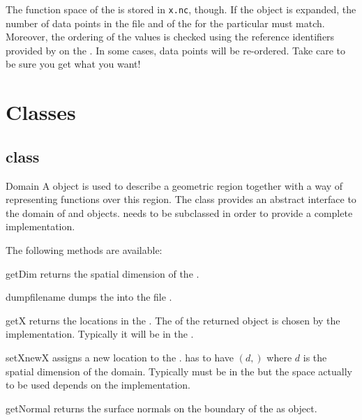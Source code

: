The function space of the \Data is stored in {\tt x.nc}, though.
If the \Data object
is expanded, the number of data points in the file and of the \Domain for the particular \FunctionSpace must match. 
Moreover, the ordering of the values is checked using the reference identifiers provided by 
\FunctionSpace on the \Domain. In some cases, data points will be re-ordered. Take care to be sure you get what you want!


\section{\escript Classes}

\subsection{\Domain class}
\begin{classdesc}{Domain}{}
A \Domain object is used to describe a geometric region together with 
a way of representing functions over this region.
The \Domain class provides an abstract interface to the domain of \FunctionSpace and \Data objects.
\Domain needs to be subclassed in order to provide a complete implementation.
\end{classdesc}
The following methods are available:
\begin{methoddesc}[Domain]{getDim}{}
returns the spatial dimension of the \Domain.
\end{methoddesc}
\begin{methoddesc}[Domain]{dump}{filename}
dumps the \Domain into the file .
\end{methoddesc}
\begin{methoddesc}[Domain]{getX}{}
returns the locations in the \Domain. The \FunctionSpace of the returned
\Data object is chosen by the \Domain implementation. Typically it will be
in the \Function.
\end{methoddesc}

\begin{methoddesc}[Domain]{setX}{newX}
assigns a new location to the \Domain.  has to have \Shape $(d,)$
where $d$ is the spatial dimension of the domain. Typically  must be
in the \ContinuousFunction but the space actually to be used depends on the \Domain implementation.
\end{methoddesc}

\begin{methoddesc}[Domain]{getNormal}{}
returns the surface normals on the boundary of the \Domain as \Data object.
\end{methoddesc}

